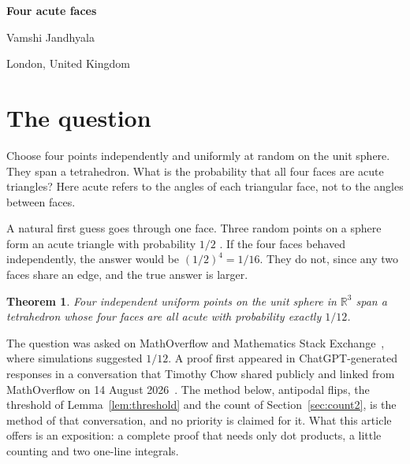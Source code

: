 \documentclass[11pt,a4paper]{article}
\newtheorem{theorem}{Theorem}
\newcommand{\R}{\mathbb{R}}
\begin{document}
\raggedbottom
\begin{center}
{\LARGE\bfseries Four acute faces\par}
\vspace{8pt}
{\large Vamshi Jandhyala\par}
\vspace{2pt}
{\small London, United Kingdom\par}
\end{center}
\vspace{6pt}
\begin{abstract}
Four points chosen independently and uniformly on a sphere span a
tetrahedron. All four of its faces are acute triangles with probability
$1/12$, although each face on its own is acute with probability $1/2$. We
give a short, self-contained proof. Replacing points by their antipodes
produces eight tetrahedra, and an obtuse angle of one of them is a short
vector sum belonging to another. The short sums fill a staircase in a
$4\times4$ grid, and counting what the staircase can look like reduces
the problem to two integrals that follow from Archimedes' hat-box
theorem. The method first appeared in a publicly shared ChatGPT
conversation.
\end{abstract}

\section{The question}

Choose four points independently and uniformly at random on the unit
sphere. They span a tetrahedron. What is the probability that all four
faces are acute triangles? Here acute refers to the angles of each
triangular face, not to the angles between faces.

A natural first guess goes through one face. Three random points on a
sphere form an acute triangle with probability $1/2$
\cite[Lemma~4]{AEN}. If the four faces behaved independently, the answer
would be $(1/2)^4=1/16$. They do not, since any two faces share an edge,
and the true answer is larger.

\begin{theorem}\label{thm}
Four independent uniform points on the unit sphere in $\R^3$ span a
tetrahedron whose four faces are all acute with probability exactly
$1/12$.
\end{theorem}

The question was asked on MathOverflow and Mathematics Stack
Exchange~\cite{MO,MSE}, where simulations suggested $1/12$. A proof first
appeared in ChatGPT-generated responses in a conversation that Timothy
Chow shared publicly and linked from MathOverflow on 14 August
2026~\cite{ChowChat}. The method below, antipodal flips, the threshold of
Lemma~\ref{lem:threshold} and the count of Section~\ref{sec:count2}, is the
method of that conversation, and no priority is claimed for it. What this
article offers is an exposition: a complete proof that needs only dot
products, a little counting and two one-line integrals.
\end{document}
